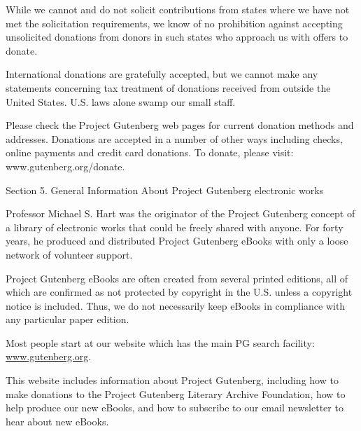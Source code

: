 \documentclass[11pt,openany,oneside]{book}
\begin{document}
While we cannot and do not solicit contributions from states where we have not met the solicitation requirements, we know of no prohibition against accepting unsolicited donations from donors in such states who approach us with offers to donate. 

International donations are gratefully accepted, but we cannot make any statements concerning tax treatment of donations received from outside the United States. U.S. laws alone swamp our small staff. 

Please check the Project Gutenberg web pages for current donation methods and addresses. Donations are accepted in a number of other ways including checks, online payments and credit card donations. To donate, please visit: www.gutenberg.org/donate. 

Section 5. General Information About Project Gutenberg electronic works 

Professor Michael S. Hart was the originator of the Project Gutenberg concept of a library of electronic works that could be freely shared with anyone. For forty years, he produced and distributed Project Gutenberg eBooks with only a loose network of volunteer support. 

Project Gutenberg eBooks are often created from several printed editions, all of which are confirmed as not protected by copyright in the U.S. unless a copyright notice is included. Thus, we do not necessarily keep eBooks in compliance with any particular paper edition. 

Most people start at our website which has the main PG search facility: \href{https://www.gutenberg.org}{\uline{www.gutenberg.org}}. 

This website includes information about Project Gutenberg, including how to make donations to the Project Gutenberg Literary Archive Foundation, how to help produce our new eBooks, and how to subscribe to our email newsletter to hear about new eBooks. 
\end{document}
